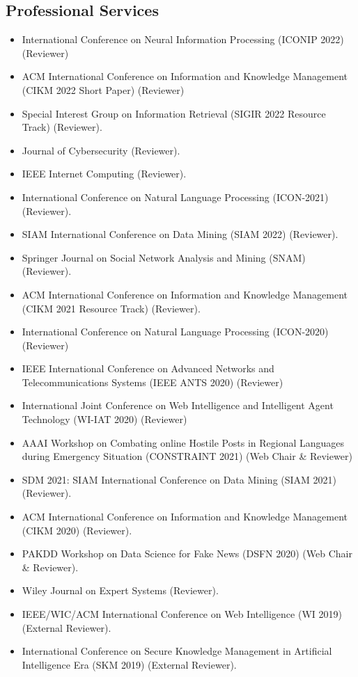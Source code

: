 \documentclass[margin, centered]{res}
\begin{document}
\begin{resume}
\section{Professional Services}
\begin{itemize}[leftmargin=*]
\item International Conference on Neural Information Processing (ICONIP 2022) (Reviewer)
\item ACM International Conference on Information and Knowledge Management (CIKM 2022 Short Paper) (Reviewer)
\item Special Interest Group on Information Retrieval (SIGIR 2022 Resource Track) (Reviewer).
\item Journal of Cybersecurity (Reviewer).
\item IEEE Internet Computing (Reviewer).
\item International Conference on Natural Language Processing (ICON-2021) (Reviewer).
\item SIAM International Conference on Data Mining (SIAM 2022) (Reviewer).
\item Springer Journal on Social Network Analysis and Mining (SNAM)   (Reviewer).
   \item ACM International Conference on Information and Knowledge Management (CIKM 2021 Resource Track) (Reviewer).
    \item International Conference on Natural Language Processing (ICON-2020) (Reviewer)
    \item IEEE International Conference on Advanced Networks and Telecommunications Systems (IEEE ANTS 2020) (Reviewer)
    \item International Joint Conference on Web Intelligence and Intelligent Agent Technology (WI-IAT 2020) (Reviewer)
	\item AAAI Workshop on Combating online Hostile Posts in Regional Languages during Emergency Situation (CONSTRAINT 2021) (Web Chair \& Reviewer)
	\item SDM 2021: SIAM International Conference on Data Mining (SIAM 2021) (Reviewer).
	\item ACM International Conference on Information and Knowledge Management (CIKM 2020) (Reviewer).
	\item PAKDD Workshop on Data Science for Fake News (DSFN 2020) (Web Chair \& Reviewer).
	\item Wiley Journal on Expert Systems (Reviewer).
	\item IEEE/WIC/ACM International Conference on Web Intelligence (WI 2019) (External Reviewer).
	\item International Conference on Secure Knowledge Management in Artificial Intelligence Era (SKM 2019) (External Reviewer).
\end{itemize}


\end{resume}
\end{document}
